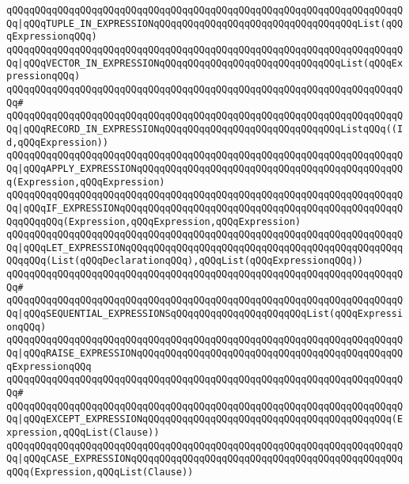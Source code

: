 \verb|qQQqqQQqqQQqqQQqqQQqqQQqqQQqqQQqqQQqqQQqqQQqqQQqqQQqqQQqqQQqqQQqqQQqqQQq|\verb#|qQQqTUPLE_IN_EXPRESSIONqQQqqQQqqQQqqQQqqQQqqQQqqQQqqQQqqQQqList(qQQqExpressionqQQq)#\newline
\verb|qQQqqQQqqQQqqQQqqQQqqQQqqQQqqQQqqQQqqQQqqQQqqQQqqQQqqQQqqQQqqQQqqQQqqQQq|\verb#|qQQqVECTOR_IN_EXPRESSIONqQQqqQQqqQQqqQQqqQQqqQQqqQQqqQQqList(qQQqExpressionqQQq)#\newline
\verb|qQQqqQQqqQQqqQQqqQQqqQQqqQQqqQQqqQQqqQQqqQQqqQQqqQQqqQQqqQQqqQQqqQQqqQQq#|\newline
\verb|qQQqqQQqqQQqqQQqqQQqqQQqqQQqqQQqqQQqqQQqqQQqqQQqqQQqqQQqqQQqqQQqqQQqqQQq|\verb#|qQQqRECORD_IN_EXPRESSIONqQQqqQQqqQQqqQQqqQQqqQQqqQQqqQQqListqQQq((Id,qQQqExpression))#\newline
\verb|qQQqqQQqqQQqqQQqqQQqqQQqqQQqqQQqqQQqqQQqqQQqqQQqqQQqqQQqqQQqqQQqqQQqqQQq|\verb#|qQQqAPPLY_EXPRESSIONqQQqqQQqqQQqqQQqqQQqqQQqqQQqqQQqqQQqqQQqqQQqqQQq(Expression,qQQqExpression)#\newline
\verb|qQQqqQQqqQQqqQQqqQQqqQQqqQQqqQQqqQQqqQQqqQQqqQQqqQQqqQQqqQQqqQQqqQQqqQQq|\verb#|qQQqIF_EXPRESSIONqQQqqQQqqQQqqQQqqQQqqQQqqQQqqQQqqQQqqQQqqQQqqQQqqQQqqQQqqQQq(Expression,qQQqExpression,qQQqExpression)#\newline
\verb|qQQqqQQqqQQqqQQqqQQqqQQqqQQqqQQqqQQqqQQqqQQqqQQqqQQqqQQqqQQqqQQqqQQqqQQq|\verb#|qQQqLET_EXPRESSIONqQQqqQQqqQQqqQQqqQQqqQQqqQQqqQQqqQQqqQQqqQQqqQQqqQQqqQQq(List(qQQqDeclarationqQQq),qQQqList(qQQqExpressionqQQq))#\newline
\verb|qQQqqQQqqQQqqQQqqQQqqQQqqQQqqQQqqQQqqQQqqQQqqQQqqQQqqQQqqQQqqQQqqQQqqQQq#|\newline
\verb|qQQqqQQqqQQqqQQqqQQqqQQqqQQqqQQqqQQqqQQqqQQqqQQqqQQqqQQqqQQqqQQqqQQqqQQq|\verb#|qQQqSEQUENTIAL_EXPRESSIONSqQQqqQQqqQQqqQQqqQQqqQQqList(qQQqExpressionqQQq)#\newline
\verb|qQQqqQQqqQQqqQQqqQQqqQQqqQQqqQQqqQQqqQQqqQQqqQQqqQQqqQQqqQQqqQQqqQQqqQQq|\verb#|qQQqRAISE_EXPRESSIONqQQqqQQqqQQqqQQqqQQqqQQqqQQqqQQqqQQqqQQqqQQqqQQqExpressionqQQq#\newline
\verb|qQQqqQQqqQQqqQQqqQQqqQQqqQQqqQQqqQQqqQQqqQQqqQQqqQQqqQQqqQQqqQQqqQQqqQQq#|\newline
\verb|qQQqqQQqqQQqqQQqqQQqqQQqqQQqqQQqqQQqqQQqqQQqqQQqqQQqqQQqqQQqqQQqqQQqqQQq|\verb#|qQQqEXCEPT_EXPRESSIONqQQqqQQqqQQqqQQqqQQqqQQqqQQqqQQqqQQqqQQqqQQq(Expression,qQQqList(Clause))#\newline
\verb|qQQqqQQqqQQqqQQqqQQqqQQqqQQqqQQqqQQqqQQqqQQqqQQqqQQqqQQqqQQqqQQqqQQqqQQq|\verb#|qQQqCASE_EXPRESSIONqQQqqQQqqQQqqQQqqQQqqQQqqQQqqQQqqQQqqQQqqQQqqQQqqQQq(Expression,qQQqList(Clause))#\newline
